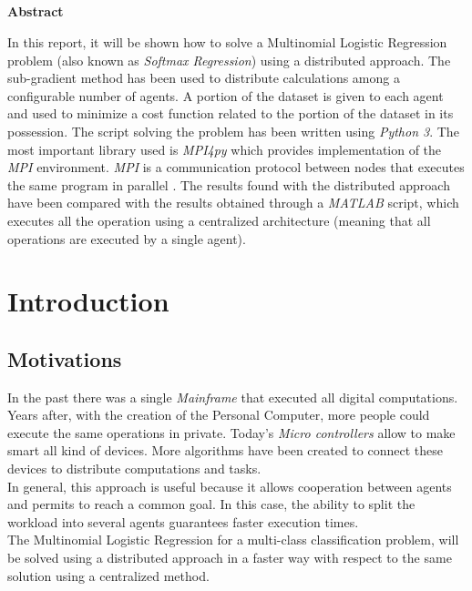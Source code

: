 \documentclass[a4paper,11pt,oneside]{book}
\begin{document}
\pagestyle{myheadings}



\newpage
\thispagestyle{empty}

\begin{center}
\chapter*{}
\thispagestyle{empty}
{\Huge \textbf{Abstract}}\\
\vspace{15mm}
\end{center}
In this report, it will be shown how to solve a Multinomial Logistic Regression problem (also known as \textit{Softmax Regression}) using a distributed approach. The sub-gradient method has been used to distribute calculations among a configurable number of agents. A portion of the dataset is given to each agent and used to minimize a cost function related to the portion of the dataset in its possession.
The script solving the problem has been written using \textit{Python 3}. The most important library used is \textit{MPI4py} which provides implementation of the \textit{MPI} environment. \textit{MPI} is a communication protocol between nodes that executes the same program in parallel \cite{CITATION:4}. The results found with the distributed approach have been compared with the results obtained through a \textit{MATLAB} script, which executes all the operation using a centralized architecture (meaning that all operations are executed by a single agent).\\


\tableofcontents \thispagestyle{empty}
\listoffigures\thispagestyle{empty}

\chapter*{Introduction}

\section*{Motivations}
In the past there was a single \textit{Mainframe} that executed all digital computations. Years after, with the creation of the Personal Computer, more people could execute the same operations in private. Today's \textit{Micro controllers} allow to make smart all kind of devices. More algorithms have been created to connect these devices to distribute computations and tasks.\\
 In general, this approach is useful because it allows cooperation between agents and permits to reach a common goal. In this case, the ability to split the workload into several agents guarantees faster execution times.\\
The Multinomial Logistic Regression for a multi-class classification problem, will be solved using a distributed approach in a faster way with respect to the same solution using a centralized method.
\end{document}
